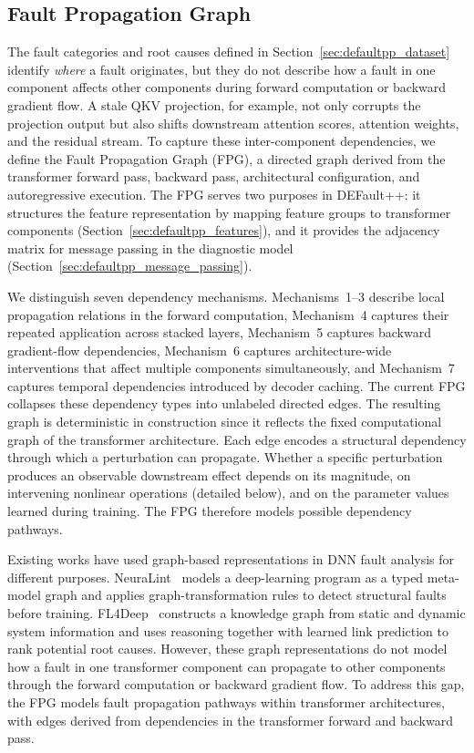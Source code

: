\subsection{Fault Propagation Graph}
\label{sec:defaultpp_fpg}

The fault categories and root causes defined in Section~\ref{sec:defaultpp_dataset} identify \emph{where} a fault originates, but they do not describe how a fault in one component affects other components during forward computation or backward gradient flow. A stale QKV projection, for example, not only corrupts the projection output but also shifts downstream attention scores, attention weights, and the residual stream. To capture these inter-component dependencies, we define the Fault Propagation Graph (FPG), a directed graph derived from the transformer forward pass, backward pass, architectural configuration, and autoregressive execution. The FPG serves two purposes in DEFault++: it structures the feature representation by mapping feature groups to transformer components (Section~\ref{sec:defaultpp_features}), and it provides the adjacency matrix for message passing in the diagnostic model (Section~\ref{sec:defaultpp_message_passing}).

We distinguish seven dependency mechanisms. Mechanisms~1--3 describe local propagation relations in the forward computation, Mechanism~4 captures their repeated application across stacked layers, Mechanism~5 captures backward gradient-flow dependencies, Mechanism~6 captures architecture-wide interventions that affect multiple components simultaneously, and Mechanism~7 captures temporal dependencies introduced by decoder caching. The current FPG collapses these dependency types into unlabeled directed edges. The resulting graph is deterministic in construction since it reflects the fixed computational graph of the transformer architecture. Each edge encodes a structural dependency through which a perturbation can propagate. Whether a specific perturbation produces an observable downstream effect depends on its magnitude, on intervening nonlinear operations (detailed below), and on the parameter values learned during training. The FPG therefore models possible dependency pathways.

Existing works have used graph-based representations in DNN fault analysis for different purposes. NeuraLint~\cite{NeuraLint} models a deep-learning program as a typed meta-model graph and applies graph-transformation rules to detect structural faults before training. FL4Deep~\cite{fl4deep} constructs a knowledge graph from static and dynamic system information and uses reasoning together with learned link prediction to rank potential root causes. However, these graph representations do not model how a fault in one transformer component can propagate to other components through the forward computation or backward gradient flow. To address this gap, the FPG models fault propagation pathways within transformer architectures, with edges derived from dependencies in the transformer forward and backward pass.


